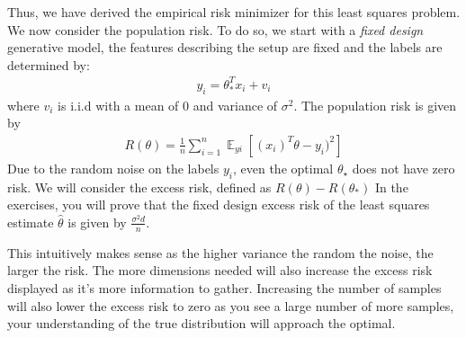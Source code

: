 Thus, we have derived the empirical risk minimizer for this least squares problem. 
We now consider the population risk. 
To do so, we start with a 
\textit{fixed design} generative model, the features describing the setup are fixed and the labels are determined by:
\begin{align*} 
y_{i} = \theta_{*}^{T}x_{i} + v_{i}
\end{align*}
where $v_{i}$ is i.i.d with a mean of $0$ and variance of $\sigma^{2}$. The population risk is given by
\begin{align*} 
R(\theta) = \frac{1}{n} \sum_{i=1}^{n}\mathop{{}\mathbb{E}}_{yi} [(x_{i})^{T}\theta - y_{i})^{2}]
\end{align*}
Due to the random noise on the labels $y_i$, even the optimal $\theta_\star$ does not have zero risk.
We will consider the excess risk, defined as $R(\theta) - R(\theta_{*})$
In the exercises, you will prove that the fixed design excess risk of the least squares estimate $\hat \theta$ is given by $\frac{\sigma^2 d}{n}$.

This intuitively makes sense as the higher variance the random the noise, the larger the risk. The more dimensions needed will also increase the excess risk displayed as it's more information to gather. Increasing the number of samples will also lower the excess risk to zero as you see a large number of more samples, your understanding of the true distribution will approach the optimal. 







